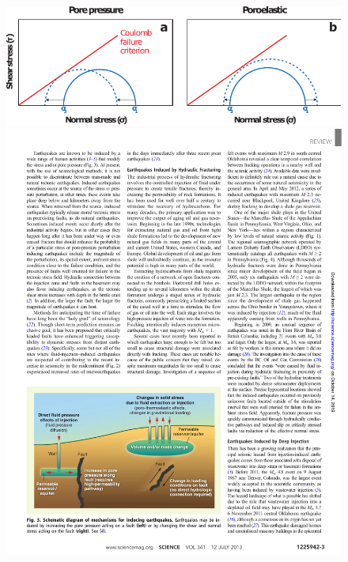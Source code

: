 


% 


\begin{figure}
	\centering
	\includegraphics[width=\linewidth]{figures/chapter3-permian/mohr-circles-toponly.pdf}
	\includegraphics[width=\linewidth]{figures/chapter3-permian/injection-ellsworth.pdf}

\end{figure}
